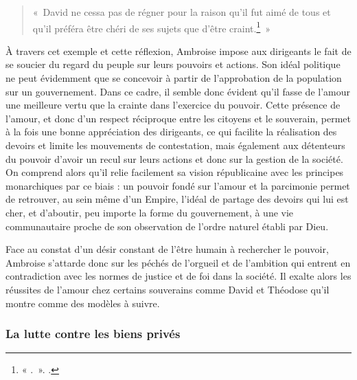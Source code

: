 \bigskip

\begin{quote}
    «~David ne cessa pas de régner pour la raison qu’il fut aimé de tous et qu’il préféra être chéri de ses sujets que d’être craint.\footnote{« .~». \cite[\nopp II, 38]{ambroise_devoirs_2}.}~»
\end{quote}

\bigskip

À travers cet exemple et cette réflexion, Ambroise impose aux dirigeants le fait de se soucier du regard du peuple sur leurs pouvoirs et actions. Son idéal politique ne peut évidemment que se concevoir à partir de l'approbation de la population sur un gouvernement. Dans ce cadre, il semble donc évident qu'il fasse de l'amour une meilleure vertu que la crainte dans l'exercice du pouvoir. Cette présence de l'amour, et donc d'un respect réciproque entre les citoyens et le souverain, permet à la fois une bonne appréciation des dirigeants, ce qui facilite la réalisation des devoirs et limite les mouvements de contestation, mais également aux détenteurs du pouvoir d'avoir un recul sur leurs actions et donc sur la gestion de la société. On comprend alors qu'il relie facilement sa vision républicaine avec les principes monarchiques par ce biais : un pouvoir fondé sur l'amour et la parcimonie permet de retrouver, au sein même d'un Empire, l'idéal de partage des devoirs qui lui est cher, et d'aboutir, peu importe la forme du gouvernement, à une vie communautaire proche de son observation de l'ordre naturel établi par Dieu.

\bigskip

Face au constat d'un désir constant de l'être humain à rechercher le pouvoir, Ambroise s'attarde donc sur les péchés de l'orgueil et de l'ambition qui entrent en contradiction avec les normes de justice et de foi dans la société. Il exalte alors les réussites de l'amour chez certains souverains comme David et Théodose qu'il montre comme des modèles à suivre.


\subsubsection{La lutte contre les biens privés}

